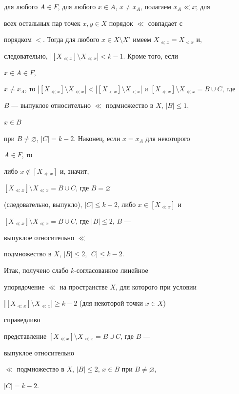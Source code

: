 для любого $A\in F$, для любого $x\in A$, $x\ne x_A$, полагаем $x_A\ll 


x$; для  


всех остальных пар точек $x,y\in X$ порядок $\ll$ совпадает с  


порядком $<$. Тогда для любого $x\in X\setminus X'$ имеем $X_{\ll 


x}=X_{<x}$ и,  


следовательно, $|[X_{\ll x}]\setminus X_{\ll x}|<k-1$. Кроме того, если 


$x\in A\in F$, 


$x\ne x_A$, то $|[X_{\ll x}]\setminus X_{\ll x}|<|[X_{<x}]\setminus 


X_{<x}|$ и $[X_{\ll x}]\setminus X_{\ll x}=B\cup C$, где 


$B$ --- выпуклое относительно $\ll$ подмножество в $X$, $|B|\le 1$, 


$x\in B$ 


при $B\ne\varnothing$, $|C|=k-2$. Наконец, если $x=x_A$ для некоторого 


$A\in F$, то  


либо $x\notin[X_{\ll x}]$ и, значит, 


$[X_{\ll x}]\setminus X_{\ll x}=B\cup C$, где $B=\varnothing$ 


(следовательно, выпукло), $|C|\le k-2$, либо $x\in[X_{\ll x}]$ и 


$[X_{\ll x}]\setminus X_{\ll x}=B\cup C$, где $|B|\le 2$, $B$ --- 


выпуклое относительно $\ll$ 


подмножество в $X$, $|B|\le 2$, $|C|\le k-2$. 


 


Итак, получено слабо $k$-согласованное линейное  


упорядочение $\ll$ на пространстве $X$, для которого при условии  


$|[X_{\ll x}]\setminus X_{\ll x}|\ge k-2$ (для некоторой точки $x\in X$)


справедливо  


представление $[X_{\ll x}]\setminus X_{\ll x}=B\cup C$, где $B$ --- 


выпуклое относительно  


$\ll$ подмножество в $X$, $|B|\le 2$, $x\in B$ при $B\ne\varnothing$, 


$|C|=k-2$. 


 


